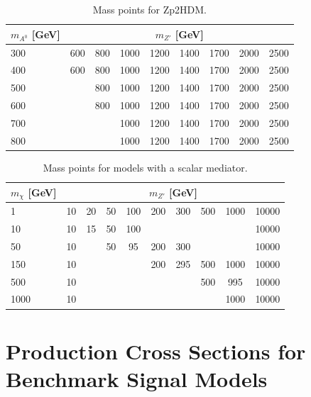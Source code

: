 \begin{table}[htbH] 
\begin{center} 
\begin{tabular}{ l | c | c | c | c | c | c | c | c} 
\hline 
$m_{A^0}$ [GeV] & \multicolumn{8}{|c}{$m_{Z'}$ [GeV]} \\ 
\hline 
300 & 600 & 800 & 1000 & 1200 & 1400 & 1700 & 2000 & 2500 \\ 
400 & 600 & 800 & 1000 & 1200 & 1400 & 1700 & 2000 & 2500 \\ 
500 & & 800 & 1000 & 1200 & 1400 & 1700 & 2000 & 2500 \\ 
600 & & 800 & 1000 & 1200 & 1400 & 1700 & 2000 & 2500 \\
700 & & & 1000 & 1200 & 1400 & 1700 & 2000 & 2500 \\ 
800 & & & 1000 & 1200 & 1400 & 1700 & 2000 & 2500 \\ 
\hline
\end{tabular} 
\caption{Mass points for Zp2HDM.}\label{tab:MM2HDM} 
\end{center} 
\end{table} 

\begin{table}[htbH] 
\begin{center} 
\begin{tabular}{ l | c | c | c | c | c | c | c | c | c} 
\hline 
$m_\chi$ [GeV] & \multicolumn{9}{c}{$m_{Z'}$ [GeV]} \\ 
\hline 
1 & 10 & 20 & 50 & 100 & 200 & 300 & 500 & 1000 & 10000 \\
10 & 10 & 15 & 50 & 100 & & & & & 10000 \\
50 & 10 & & 50 & 95  & 200 & 300 & & & 10000 \\
150 & 10 & & & & 200 & 295 & 500 & 1000 & 10000 \\
500 & 10 & & & & & & 500 & 995 & 10000 \\
1000 & 10 & & & & & & & 1000 & 10000 \\
\hline
\end{tabular} 
\caption{Mass points for models with a scalar mediator.}\label{tab:MMScalar} 
\end{center} 
\end{table} 

\section{Production Cross Sections for Benchmark Signal Models}

